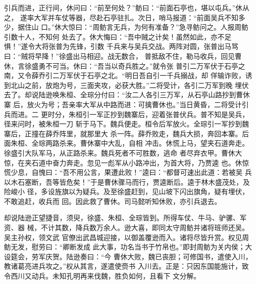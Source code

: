 引兵而进，正行间，休问曰：“前至何处？”鲂曰：“前面石亭也，堪以屯兵。”休从之，
遂率大军并车仗等器，尽赴石亭驻扎。次日，哨马报道：“前面吴兵不知多少，据住山
口。”休大惊曰：“周鲂言无兵，为何有准备？”急寻鲂问之。人报周鲂引数十人，不知何
处去了。休大悔曰：“吾中贼之计矣！虽然如此，亦不足惧！”遂令大将张普为先锋，引数
千兵来与吴兵交战。两阵对圆，张普出马骂曰：“贼将早降！”徐盛出马相迎。战无数合，
普抵敌不住，勒马收兵，回见曹休，言徐盛勇不可当。休曰：“吾当以奇兵胜之。”就令张
普引二万军伏于石亭之南，又令薛乔引二万军伏于石亭之北。“明日吾自引一千兵搦战，却
佯输诈败，诱到北山之前，放炮为号，三面夹攻，必获大胜。”二将受计，各引二万军到晚
埋伏去了。却说陆逊唤朱桓、全琮分付曰：“汝二人各引三万军，从石亭山路抄到曹休寨
后，放火为号；吾亲率大军从中路而进：可擒曹休也。”当日黄昏，二将受计引兵而进。二
更时分，朱桓引一军正抄到魏寨后，迎着张普伏兵。普不知是吴兵，径来问时，被朱桓一刀
斩于马下。魏兵便走。桓令后军放火。全琮引一军抄到魏寨后，正撞在薛乔阵里，就那里大
杀一阵。薛乔败走，魏兵大损，奔回本寨。后面朱桓、全琮两路杀来。曹休寨中大乱，自相
冲击。休慌上马，望夹石道奔走。徐盛引大队军马，从正路杀来。魏兵死者不可胜数，逃命
者尽弃衣甲。曹休大惊，在夹石道中奋力奔走。忽见一彪军从小路冲出，为首大将，乃贾逵
也。休惊慌少息，自愧曰：“吾不用公言，果遭此败！”逵曰：“都督可速出此道：若被吴
兵以木石塞断，吾等皆危矣！”于是曹休骤马而行，贾逵断后。逵于林木盛茂处，及险峻小
径，多设旌旗以为疑兵。及至徐盛赶到，见山坡下闪出旗角，疑有埋伏，不敢追赶，收兵而
回。因此救了曹休。司马懿听知休败，亦引兵退去。

却说陆逊正望捷音，须臾，徐盛、朱桓、全琮皆到。所得车仗、牛马、驴骡、军资、器
械，不计其数，降兵数万余人。逊大喜，即同太守周鲂并诸将班师还吴。吴主孙权，领文武
官僚出武昌城迎接，以御盖覆逊而入。诸将尽皆升赏。权见周鲂无发，慰劳曰：“卿断发成
此大事，功名当书于竹帛也。”即封周鲂为关内侯；大设筵会，劳军庆贺。陆逊奏曰：“今
曹休大败，魏已丧胆；可修国书，遣使入川，教诸葛亮进兵攻之。”权从其言，遂遣使赍书
入川去。正是：只因东国能施计，致令西川又动兵。未知孔明再来伐魏，胜负如何，且看下
文分解。
